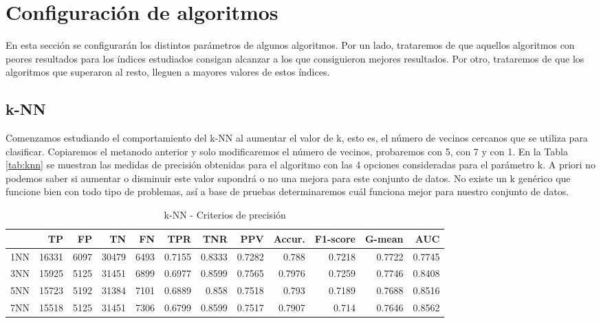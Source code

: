 \documentclass[a4paper, 20pt]{article}
\begin{document}
\section{Configuración de algoritmos}

En esta sección se configurarán los distintos parámetros de algunos algoritmos. Por un lado, trataremos de que aquellos algoritmos con peores resultados para los índices estudiados consigan alcanzar a los que consiguieron mejores resultados. Por otro, trataremos de que los algoritmos que superaron al resto, lleguen a mayores valores de estos índices.

\subsection{k-NN}

Comenzamos estudiando el comportamiento del k-NN al aumentar el valor de k, esto es, el número de vecinos cercanos que se utiliza para clasificar. Copiaremos el metanodo anterior y solo modificaremos el número de vecinos, probaremos con 5, con 7 y con 1. En la Tabla \ref{tab:knn} se muestran las medidas de precisión obtenidas para el algoritmo con las 4 opciones consideradas para el parámetro k. A priori no podemos saber si aumentar o disminuir este valor supondrá o no una mejora para este conjunto de datos. No  existe un k genérico que funcione bien con todo tipo de problemas, así a base de pruebas determinaremos cuál funciona mejor para nuestro conjunto de datos.

\begin{table}[H]
\centering
\caption{k-NN - Criterios de precisión}
\label{tab:}
\begin{tabular}{lrrrrrrrrrrr}
\toprule
 & TP & FP & TN & FN & TPR & TNR & PPV & Accur. & F1-score & G-mean & AUC\\ \midrule
1NN & 16331 & 6097 & 30479 & 6493 & 0.7155 & 0.8333 & 0.7282 & 0.788 & 0.7218 & 0.7722 & 0.7745\\
3NN & 15925 & 5125 & 31451 & 6899 & 0.6977 & 0.8599 & 0.7565 & 0.7976 & 0.7259 & 0.7746 & 0.8408\\
5NN & 15723 & 5192 & 31384 & 7101 & 0.6889 & 0.858 & 0.7518 & 0.793 & 0.7189 & 0.7688 & 0.8516\\
7NN & 15518 & 5125 & 31451 & 7306 & 0.6799 & 0.8599 & 0.7517 & 0.7907 & 0.714 & 0.7646 & 0.8562\\
\bottomrule
\end{tabular}
\end{table}
\end{document}
